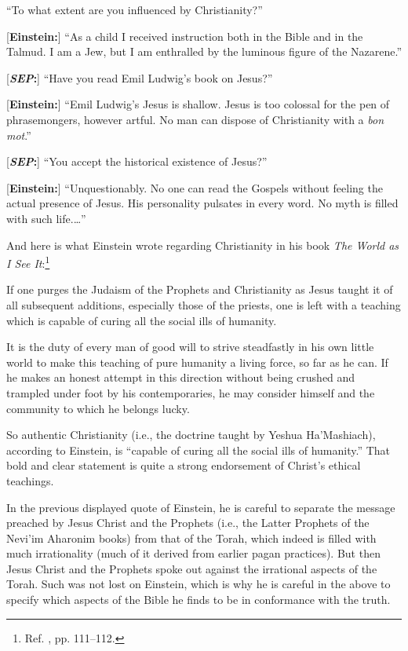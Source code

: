 \documentclass[letterpaper,12pt]{article}
\newenvironment{squotation}
  {\small\quotation}
  {\endquotation\normalsize}
\begin{document}
\begin{squotation}
[\textbf{\emph{SEP}:}] ``To what extent are you influenced by Christianity?''

[\textbf{Einstein:}] ``As a child I received instruction both in the Bible and in the Talmud. I am a Jew, but I am enthralled by the luminous figure of the Nazarene.''

[\textbf{\emph{SEP}:}] ``Have you read Emil Ludwig's book on Jesus?''

[\textbf{Einstein:}] ``Emil Ludwig's Jesus is shallow. Jesus is too colossal for the pen of phrasemongers, however artful. No man can dispose of Christianity with a \emph{bon mot}.''

[\textbf{\emph{SEP}:}] ``You accept the historical existence of Jesus?''

[\textbf{Einstein:}] ``Unquestionably. No one can read the Gospels without feeling the actual presence of Jesus. His personality pulsates in every word. No myth is filled with such life.\thinspace\ldots''
\end{squotation}

And here is what Einstein wrote regarding Christianity in his book \emph{The World as I See It}:\footnote{Ref. , pp. 111--112.}

\begin{squotation}
If one purges the Judaism of the Prophets and Christianity as Jesus taught it of all subsequent additions, especially those of the priests, one is left with a teaching which is capable of curing all the social ills of humanity.

It is the duty of every man of good will to strive steadfastly in his own little world to make this teaching of pure humanity a living force, so far as he can. If he makes an honest attempt in this direction without being crushed and trampled under foot by his contemporaries, he may consider himself and the community to which he belongs lucky.
\end{squotation}

So authentic Christianity (i.e., the doctrine taught by Yeshua Ha'Mashiach), according to Einstein, is ``capable of curing all the social ills of humanity.'' That bold and clear statement is quite a strong endorsement of Christ's ethical teachings.

In the previous displayed quote of Einstein, he is careful to separate the message preached by Jesus Christ and the Prophets (i.e., the Latter Prophets of the Nevi'im Aharonim books) from that of the Torah, which indeed is filled with much irrationality (much of it derived from earlier pagan practices). But then Jesus Christ and the Prophets spoke out against the irrational aspects of the Torah. Such was not lost on Einstein, which is why he is careful in the above to specify which aspects of the Bible he finds to be in conformance with the truth.
\end{document}
